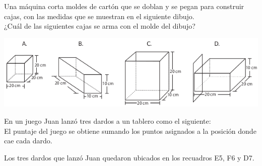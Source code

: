 \documentclass[10pt,letterpaper,addpoints]{exam}
\begin{document}
\begin{questions}
\begin{minipage}{.65\textwidth}
\question
Una máquina corta moldes de cartón que se doblan y se pegan para construir cajas, con las medidas que se muestran en el siguiente dibujo.\\

¿Cuál de las siguientes cajas se arma con el molde del dibujo?
\end{minipage}\hfill
\begin{minipage}{.35\textwidth}
\end{minipage}
\begin{center}
\includegraphics[scale=.75]{Images/cajas.png} 
\end{center}
\begin{minipage}{.35\textwidth}
\question
En un juego Juan lanzó tres dardos a un tablero como el siguiente:\\

El puntaje del juego se obtiene sumando los puntos asignados a la posición donde cae cada dardo.

Los tres dardos que lanzó Juan quedaron ubicados en los recuadros E5, F6 y D7.\\


\end{minipage}
\end{questions}
\end{document}
